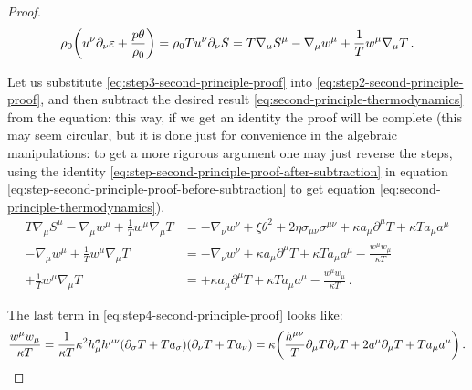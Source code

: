 \documentclass[main.tex]{subfiles}
\begin{document}
\begin{proof}
    \begin{equation} \label{eq:step3-second-principle-proof}
        \rho_0 \qty(u^\nu \partial_\nu \varepsilon + \frac{p \theta}{\rho_0})
        = \rho_0 T u^\nu \partial_\nu S
        = T\nabla_\mu S^\mu - \nabla_\mu w^\mu + \frac{1}{T} w^\mu \nabla_\mu T\,.
    \end{equation}

    Let us substitute \eqref{eq:step3-second-principle-proof} into \eqref{eq:step2-second-principle-proof},
    and then subtract the desired result \eqref{eq:second-principle-thermodynamics}  from the equation: this way, if we get an identity the proof will be complete (this may seem circular, but it is done just for convenience in the algebraic manipulations: to get a more rigorous argument one may just reverse the steps, using the identity \eqref{eq:step-second-principle-proof-after-subtraction} in equation \eqref{eq:step-second-principle-proof-before-subtraction} to get equation \eqref{eq:second-principle-thermodynamics}).
    \begin{subequations}
    \begin{align}
      T\nabla_\mu S^\mu - \nabla_\mu w^\mu + \frac{1}{T} w^\mu \nabla_\mu T &=
      - \nabla_\nu w^\nu
      + \xi \theta^2 + 2 \eta \sigma_{\mu\nu} \sigma^{\mu\nu}
      + \kappa a_\mu \partial^\mu T + \kappa T a_\mu a^\mu
      \label{eq:step-second-principle-proof-before-subtraction} \\
      - \nabla_\mu w^\mu + \frac{1}{T} w^\mu \nabla_\mu T &=
      - \nabla_\nu w^\nu
      + \kappa a_\mu \partial^\mu T + \kappa T a_\mu a^\mu
      - \frac{w^\mu w_\mu}{\kappa T} \label{eq:step-second-principle-proof-after-subtraction} \\
      + \frac{1}{T} w^\mu \nabla_\mu T &=
      + \kappa a_\mu \partial^\mu T + \kappa T a_\mu a^\mu
      - \frac{w^\mu w_\mu}{\kappa T} \,. \label{eq:step4-second-principle-proof}
    \end{align}
    \end{subequations}

    The last term in \eqref{eq:step4-second-principle-proof} looks like:
    \begin{equation} \label{eq:step5-second-principle-proof}
        \frac{w^\mu w_\mu}{\kappa T} = \frac{1}{\kappa T }
        \kappa^2 h^\sigma _\mu h^{\mu\nu} \qty(\partial_\sigma T + T a_\sigma) \qty(\partial_\nu T + T a_\nu)
        = \kappa \qty(\frac{h^{\mu\nu}}{T} \partial_\mu T \partial_\nu T + 2 a^\mu \partial_\mu T + T a_\mu a^\mu) \,.
    \end{equation}


\end{proof}
\end{document}
